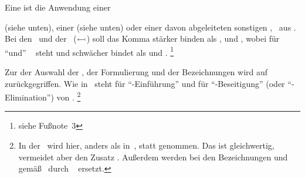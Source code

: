 Eine  ist die Anwendung einer \emph{\Substitution}{ (siehe unten), einer \emph{\Basisregel} (siehe unten) oder einer davon abgeleiteten sonstigen \emph{\Schlussregel}, \textzB\ aus .
Bei den \Schlussregeln\ und der \Substitution\ ($\subst$) soll das Komma stärker binden als \chrqt{$\derivesym$}, \chrqt{$\subst$} und \chrqt{$\srand$},
 wobei \chrqt{$\srand$} für \enquote{und} \textbzgl\  steht und schwächer bindet als \chrqt{$\derivesym$} und \chrqt{$\subst$}.%
\footnote{siehe Fußnote~3 } %

Zur der Auswahl der \Basisregeln, der Formulierung und der Bezeichnungen wird auf~\cite{bib:Rautenberg,bib:NatuerlichesSchliessen} zurückgegriffen.
Wie in~\cite{bib:NatuerlichesSchliessen} steht  für \enquote{-Einführung} und  für \enquote{-Beseitigung} (oder \enquote{-Elimination}) von \Junktoren.%
\footnote{%
	In der \Monotonieregel\ wird hier, anders als in~\cite{bib:Rautenberg},  statt  genommen. Das ist gleichwertig, vermeidet aber den Zusatz .
	Außerdem werden bei den Bezeichnungen  und  gemäß~\cite{bib:NatuerlichesSchliessen} durch \seqqt{$\andE$} \textbzw\ \seqqt{$\andB$} ersetzt.
}

}

